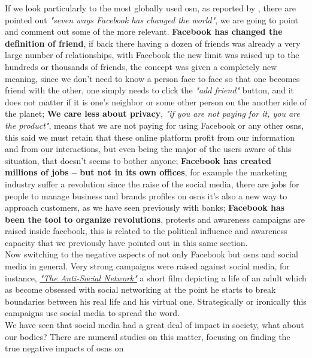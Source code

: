 \indent If we look particularly to the most globally used \gls{osn}, as reported by \citep{relrevfacebook}, there are pointed out \textit{"seven ways Facebook has changed the world"}, we are going to point and comment out some of the more relevant. \textbf{Facebook has changed the definition of friend}, if back there having a dozen of friends was already a very large number of relationships, with Facebook the new limit was raised up to the hundreds or thousands of friends, the concept was given a completely new meaning, since we don't need to know a person face to face so that one becomes friend with the other, one simply needs to click the \textit{"add friend"} button, and it does not matter if it is one's neighbor or some other person on the another side of the planet; \textbf{We care less about privacy}, \textit{"if you are not paying for it, you are the product"}, means that we are not paying for using Facebook or any other \glspl{osn}, this said we must retain that these online platform profit from our information and from our interactions, but even being the major of the users aware of this situation, that doesn't seems to bother anyone; \textbf{Facebook has created millions of jobs – but not in its own offices}, for example the marketing industry suffer a revolution since the raise of the social media, there are jobs for people to manage business and brands profiles on \glspl{osn} it's also a new way to approach customers, as we have seen previously with banks; \textbf{Facebook has been the tool to organize revolutions}, protests and awareness campaigns are raised inside facebook, this is related to the political influence and awareness capacity that we previously have pointed out in this same section.\\
\indent Now switching to the negative aspects of not only Facebook but \glspl{osn} and social media in general. Very strong campaigns were raised against social media, for instance, \href{http://www.imdb.com/title/tt3333168/}{\textit{"The Anti-Social Network"}} a short film depicting a life of an adult which as become obsessed with social networking at the point he starts to break boundaries between his real life and his virtual one. Strategically or ironically this campaigns use social media to spread the word.\\
\indent We have seen that social media had a great deal of impact in society, what about our bodies?  There are numeral studies on this matter, focusing on finding the true negative impacts of \glspl{osn} on
